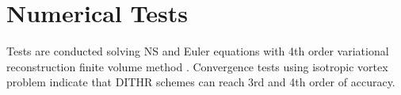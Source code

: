 \documentclass[10pt]{article}
\newcommand{\uu}{\overline{\mathbf{U}}}
\newcommand{\R}{\mathbf{R}}
\newcommand{\inc}{\mathrm\Delta}
\newcommand{\Tau}{\mathrm{T}}
\renewcommand{\Res}{\mathcal{R}}
\newcommand{\eye}{\mathbf{I}}
\begin{document}

\section{Numerical Tests}

Tests are conducted solving NS and Euler equations with 4th order variational
reconstruction finite volume method \cite{wang2017compact_VR}. 
Convergence tests using isotropic vortex problem 
indicate that DITHR schemes can reach 3rd and 4th order
of accuracy. 
\end{document}

